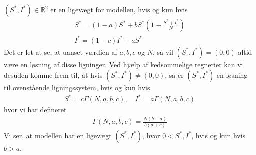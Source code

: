 \documentclass[12pt]{article}
\begin{document}
$(S^*,I^*)\in \mathbb{R}^2$ er en ligevægt for modellen, hvis og kun hvis
\begin{align}
S^* = (1-a)S^* + bS^*\left(1 - \frac{S^* + I^*}{N} \right)\\
I^* = (1-c)I^* + aS^*
\end{align}
Det er let at se, at uanset værdien af $a, b, c$ og $N$, så vil $(S^*,I^*)=(0,0)$ altid være en løsning af disse ligninger. Ved hjælp af kedsommelige regnerier kan vi desuden komme frem til, at hvis $(S^*,I^*)\neq(0,0)$, så er $(S^*,I^*)$ en løsning til ovenstående ligningssystem, hvis og kun hvis
\begin{align}
S^* = c\Gamma(N,a,b,c), \quad I^* = a\Gamma(N,a,b,c)
\end{align}
hvor vi har defineret
\begin{align}
\Gamma(N,a,b,c) =  \frac{N(b-a)}{b(a+c)}
\end{align}
Vi ser, at modellen har en ligevægt $(S^*, I^*)$, hvor $0<S^*, I^*$, hvis og kun hvis $b>a$.
\end{document}
